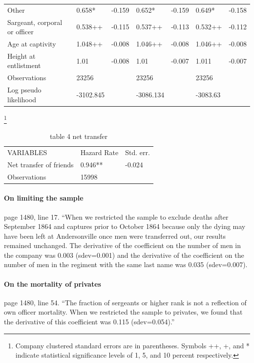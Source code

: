 \documentclass{article}
\begin{document}
\begin{table}
\begin{tabular}{lllllll}
Other                                    & 0.658*      & -0.159    & 0.652*      & -0.159    & 0.649*      & -0.158    \\
Sargeant, corporal or officer            & 0.538++     & -0.115    & 0.537++     & -0.113    & 0.532++     & -0.112    \\
Age at captivity                         & 1.048++     & -0.008    & 1.046++     & -0.008    & 1.046++     & -0.008    \\
Height at entlistment                    & 1.01        & -0.008    & 1.01        & -0.007    & 1.011       & -0.007    \\
Observations                             & 23256       &           & 23256       &           & 23256       &           \\
Log pseudo likelihood                    & -3102.845   &           & -3086.134   &           & -3083.63    &           \\
\end{tabular}
\end{table}

\begin{table}[ht]
\centering
\caption{table 4 net transfer}\footnote{Company clustered standard errors are in parentheses. Symbols ++, +, and * indicate statistical significance levels of 1, 5, and 10 percent respectively.}
\begin{tabular}{lll}
\hline
VARIABLES               & Hazard Rate & Std. err. \\
Net transfer of friends & 0.946**     & -0.024    \\
Observations            & 15998       &           \\
\end{tabular}
\end{table}

\paragraph{On limiting the sample}
page 1480, line 17. ``When we restricted the sample to exclude deaths after September 1864 and captures prior to October 1864 because only the dying may have been left at Andersonville once men were transferred out, our results remained unchanged. The derivative of the coefficient on the number of men in the company was 0.003 (sdev=0.001) and the derivative of the coefficient on the number of men in the regiment with the same last name was 0.035 (sdev=0.007).

\paragraph{On the mortality of privates}
page 1480, line 54. ``The fraction of sergeants or higher rank is not a reflection of own officer mortality. When we restricted the sample to privates, we found that the derivative of this coefficient was 0.115 (sdev=0.054).''
\end{document}
